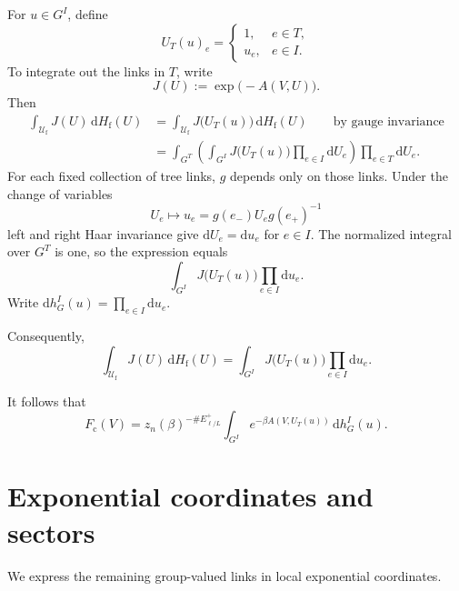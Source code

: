 \documentclass[10pt,reqno]{amsart}
\theoremstyle{definition}
\theoremstyle{remark}
\numberwithin{equation}{section}
\numberwithin{figure}{section}
\newcommand{\dd}{\mathrm d}
\newcommand{\Uf}{\mathcal U_{\mathrm f}}
\newcommand{\Hf}{H_{\mathrm f}}
\newcommand{\Fc}{F_{\mathrm c}}
\begin{document}
For $u\in G^I$, define
\begin{equation}\label{eq:display-069}
U_T(u)_e=
\begin{cases}
1,&e\in T,\\
u_e,&e\in I.
\end{cases}
\end{equation}
To integrate out the links in $T$, write
\begin{equation}\label{eq:display-070}
J(U):=\exp\bigl(-A(V,U)\bigr).
\end{equation}
Then
\begin{equation}\label{eq:display-071}
\begin{aligned}
\int_{\Uf}J(U)\,\dd\Hf(U)
&=\int_{\Uf}J\bigl(U_T(u)\bigr)\,\dd\Hf(U)
\qquad\text{by gauge invariance}\\
&=\int_{G^T}\left(\int_{G^I}J\bigl(U_T(u)\bigr)
\prod_{e\in I}\dd U_e\right)\prod_{e\in T}\dd U_e.
\end{aligned}
\end{equation}
For each fixed collection of tree links, $g$ depends only on those links. Under the change of variables
\begin{equation}\label{eq:display-072}
U_e\longmapsto u_e=g(e_-)U_eg(e_+)^{-1}
\end{equation}
left and right Haar invariance give $\dd U_e=\dd u_e$ for $e\in I$. The normalized integral over $G^T$ is one, so the expression equals
\begin{equation}\label{eq:display-073}
\int_{G^I}J\bigl(U_T(u)\bigr)\prod_{e\in I}\dd u_e.
\end{equation}
Write $\dd h_G^I(u)=\prod_{e\in I}\dd u_e$.

Consequently,
\begin{equation}\label{eq:display-074}
\int_{\Uf}J(U)\,\dd\Hf(U)
=\int_{G^I}J\bigl(U_T(u)\bigr)\prod_{e\in I}\dd u_e.
\end{equation}

It follows that
\begin{equation}\label{eq:display-075}
\boxed{
\Fc(V)=z_n(\beta)^{-\#E_{\ell/L}^+}
\int_{G^I}e^{-\beta A(V,U_T(u))}\,\dd h_G^I(u).
}
\end{equation}
\section{Exponential coordinates and sectors}\label{sec:sector-coordinates}
We express the remaining group-valued links in local exponential coordinates.
\end{document}
